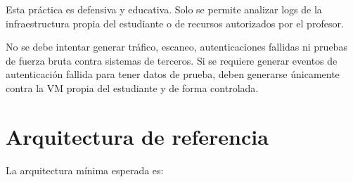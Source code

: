 \documentclass[
  coursetitle={Cómputo Nube y Tecnologías Emergentes},
  coursehours={96},
  coursedate={Verano 2026},
  doctype={Práctica},
  otherlangs={english,french},
  authorname={Lázaro},
  authorsurname={Bustio-Martínez},
  authortitle={PhD},
  role={Profesor Investigador},
  email={lbustio@inaoe.mx},
  phone={5559504000},
  ext={7459},
  institution={Instituto Nacional de Astrofísica, Óptica y Electrónica (INAOE)},
  department={Maestría en Ciencias en Tecnologías de Seguridad},
  address={Luis Enrique Erro 1, Sta. Ma. Tonantzintla, San Andrés Cholula, CP 72840, Puebla, México},
  margin={0.5in}
]{../../lbustio_lecture_notes}
\begin{document}
\begin{tcolorbox}[title=Uso defensivo y autorizado,colback=cloudred!5,colframe=cloudred]
Esta práctica es defensiva y educativa. Solo se permite analizar logs de la infraestructura propia del estudiante o de recursos autorizados por el profesor.

No se debe intentar generar tráfico, escaneo, autenticaciones fallidas ni pruebas de fuerza bruta contra sistemas de terceros. Si se requiere generar eventos de autenticación fallida para tener datos de prueba, deben generarse únicamente contra la VM propia del estudiante y de forma controlada.
\end{tcolorbox}

\section{Arquitectura de referencia}

La arquitectura mínima esperada es:
\end{document}
